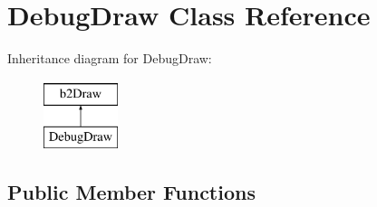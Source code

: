 \hypertarget{classDebugDraw}{\section{Debug\-Draw Class Reference}
\label{classDebugDraw}
}
Inheritance diagram for Debug\-Draw\-:\begin{figure}[H]
\begin{center}
\leavevmode
\includegraphics[height=2.000000cm]{classDebugDraw}
\end{center}
\end{figure}
\subsection*{Public Member Functions}
